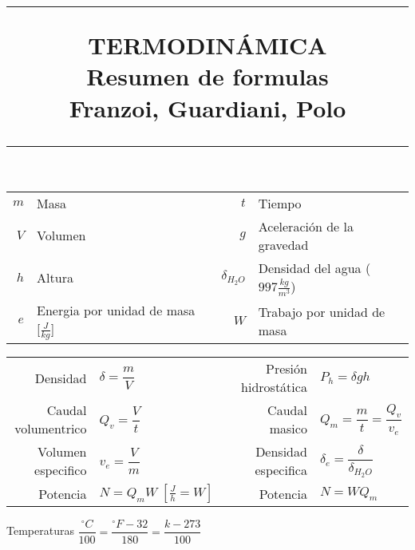 \documentclass[a4paper, 11pt,titlepage]{book}
\title{
	\begin{spacing}{1}
		\hrule
		\vspace{0.2cm}
		\textbf{\Large{TERMODINÁMICA}\\}
		\textbf{\Large{Resumen de formulas\\}}
		\Large{Franzoi, Guardiani, Polo}
		\vspace{0.2cm}
		\hrule
	\end{spacing}
	\vspace{1cm}
	\date{}
	}
\begin{document}
	\pagestyle{fancy}
	\maketitle
	


	
%
	\begin{tcolorbox}[title =
			\large\textbf{Fórmulas Generales}]
		
		\begin{tabular}{r l c r l}
				$m$& Masa & \hspace{1cm}& $t$ & Tiempo\\
				$V$ & Volumen && $g$ & Aceleración de la gravedad  \\
				$h$ & Altura && $\delta_{H_{2}O}$ & Densidad del agua ($997 \frac{kg}{m^3}$) \\
				$e$ & Energia por unidad de masa [$\frac{J}{kg}$]&& $W$& Trabajo por unidad de masa\\
				
		\end{tabular}
	
	\begin{center}
			\begin{tabular}{r | l c r | l}
			\vspace{0.3cm} Densidad & $\delta = \dfrac{m}{V}$ &  & Presión hidrostática & $P_{h}=\delta g h$ \\ 
			\vspace{0.3cm} Caudal volumentrico & $Q_v = \dfrac{V}{t}$ & &Caudal masico & $Q_m = \dfrac{m}{t} = \dfrac{Q_v}{v_e}$ \\ 
			\vspace{0.3cm} Volumen especifico & $v_e = \dfrac{V}{m}$ & & Densidad especifica & $\delta_e = \dfrac{\delta}{\delta_{H_{2}O}}$ \\ 
			\vspace{0.3cm} Potencia & $N = Q_m W \; [\frac{J}{h} = W]$ && Potencia & $N = W Q_m$
			
		\end{tabular}
	Temperaturas $\dfrac{^\circ C}{100} = \dfrac{^\circ F - 32}{180} = \dfrac{k - 273}{100}$ 
	\end{center}
		
	\end{tcolorbox}
\end{document}

